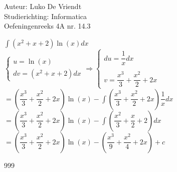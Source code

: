\documentclass[a4paper]{article}
\begin{document}
\noindent \large Auteur: Luko De Vriendt\\
\noindent \large Studierichting: Informatica\\
\noindent \large Oefeningenreeks 4A nr. 14.3\\

\medskip

\normalsize

$\displaystyle \int (x^2 + x + 2)\ln(x)dx$ \\

$\left \{
\begin{array}{l}
     u = \ln(x) \\
     dv = (x^2 + x + 2)dx
\end{array}
\right .
\Rightarrow
\left \{
\begin{array}{l}
     du = \dfrac{1}{x}dx \\ \\
     v = \dfrac{x^3}{3} + \dfrac{x^2}{2} + 2x
\end{array}
\right .$ \\

$= \left ( \dfrac{x^3}{3} + \dfrac{x^2}{2} + 2x \right )\ln(x) - \displaystyle \int \left ( \dfrac{x^3}{3} + \dfrac{x^2}{2} + 2x \right ) \dfrac{1}{x}dx$ \\

$= \left ( \dfrac{x^3}{3} + \dfrac{x^2}{2} + 2x \right )\ln(x) - \displaystyle \int \left ( \dfrac{x^2}{3} + \dfrac{x}{2} + 2 \right ) dx$ \\

$= \left ( \dfrac{x^3}{3} + \dfrac{x^2}{2} + 2x \right )\ln(x) - \left ( \dfrac{x^3}{9} + \dfrac{x^2}{4} + 2x \right ) + c$ \\

\begin{thebibliography}{999}
\end{thebibliography}
\end{document}
